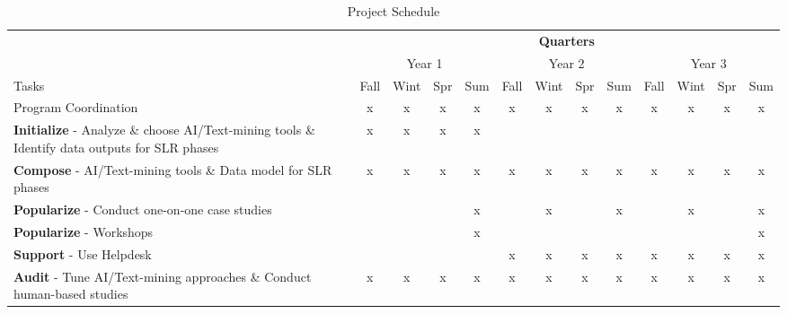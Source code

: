 \begin{table}[!bth]
\caption{Project Schedule}
\label{tab:Schedule}
{\footnotesize 
\begin{tabular}{p{}|c@{~}c@{~}c@{~}c|c@{~}c@{~}c@{~}c|c@{~}c@{~}c@{~}c|}
\cline{2-13}
	&   \multicolumn{12}{c|}{\textbf{Quarters}}  \\
	&   \multicolumn{4}{c}{Year 1}      & \multicolumn{4}{c}{Year 2}     & \multicolumn{4}{c|}{Year 3}      \\
	Tasks                          & Fall & Wint & Spr & Sum & Fall & Wint & Spr & Sum & Fall & Wint & Spr & Sum \\
\hline
	Program Coordination           & x    & x    & x   & x   & x    & x    & x   & x   & x    & x    & x   & x   \\
\hline
	\textbf{Initialize} - Analyze \& choose AI/Text-mining tools \& Identify data outputs for SLR phases       & x    & x    & x   & x   &     &     &    &    &     &     &    &    \\
\hline
	\textbf{Compose} - AI/Text-mining tools \& Data model for SLR phases       & x    & x    & x   & x   & x    &  x   & x   & x   & x    &  x   &x    & x  \\
\hline
	\textbf{Popularize} - Conduct one-on-one case studies  &     &     &    & x   &     &  x   &    & x   &     & x    &    & x   \\
\hline
	\textbf{Popularize} - Workshops                     &      &      &      &  x   &      &     &     &     &      &      &     &   x  \\
\hline
	\textbf{Support} - Use Helpdesk &      &      &      &     & x     & x    &x     & x    & x     & x     & x    & x    \\
\hline
	\textbf{Audit} - Tune AI/Text-mining approaches \& Conduct human-based studies                     &  x    &   x   &   x  &  x   &    x  &   x  &  x  &   x  &   x   &  x   &   x  & x   \\\cline{2-13}

\end{tabular}
}
\end{table}